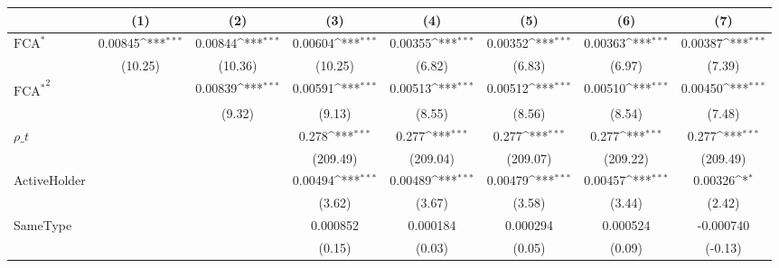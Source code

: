 {
\def\sym#1{\ifmmode^{#1}\else\(^{#1}\)\fi}
\begin{tabular}{l*{7}{c}}
\hline\hline
                    &\multicolumn{1}{c}{(1)}         &\multicolumn{1}{c}{(2)}         &\multicolumn{1}{c}{(3)}         &\multicolumn{1}{c}{(4)}         &\multicolumn{1}{c}{(5)}         &\multicolumn{1}{c}{(6)}         &\multicolumn{1}{c}{(7)}         \\
\hline
$ \text{FCA}^* $    &     0.00845\sym{***}&     0.00844\sym{***}&     0.00604\sym{***}&     0.00355\sym{***}&     0.00352\sym{***}&     0.00363\sym{***}&     0.00387\sym{***}\\
                    &     (10.25)         &     (10.36)         &     (10.25)         &      (6.82)         &      (6.83)         &      (6.97)         &      (7.39)         \\
[1em]
 $ { \text{FCA} ^ * } ^2 $&                     &     0.00839\sym{***}&     0.00591\sym{***}&     0.00513\sym{***}&     0.00512\sym{***}&     0.00510\sym{***}&     0.00450\sym{***}\\
                    &                     &      (9.32)         &      (9.13)         &      (8.55)         &      (8.56)         &      (8.54)         &      (7.48)         \\
[1em]
$ \rho\_t $          &                     &                     &       0.278\sym{***}&       0.277\sym{***}&       0.277\sym{***}&       0.277\sym{***}&       0.277\sym{***}\\
                    &                     &                     &    (209.49)         &    (209.04)         &    (209.07)         &    (209.22)         &    (209.49)         \\
[1em]
ActiveHolder        &                     &                     &     0.00494\sym{***}&     0.00489\sym{***}&     0.00479\sym{***}&     0.00457\sym{***}&     0.00326\sym{*}  \\
                    &                     &                     &      (3.62)         &      (3.67)         &      (3.58)         &      (3.44)         &      (2.42)         \\
[1em]
SameType            &                     &                     &    0.000852         &    0.000184         &    0.000294         &    0.000524         &   -0.000740         \\
                    &                     &                     &      (0.15)         &      (0.03)         &      (0.05)         &      (0.09)         &     (-0.13)         \\

\end{tabular}}
